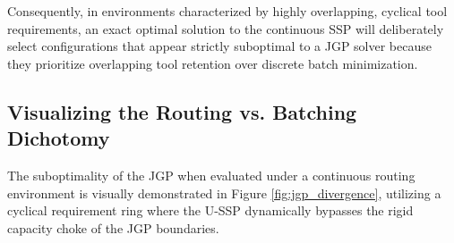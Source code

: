 \documentclass[11pt, a4paper]{book}
\begin{document}
	Consequently, in environments characterized by highly overlapping, cyclical tool requirements, an exact optimal solution to the continuous SSP will deliberately select configurations that appear strictly suboptimal to a JGP solver because they prioritize overlapping tool retention over discrete batch minimization.
	
	\subsection{Visualizing the Routing vs. Batching Dichotomy}
	
	The suboptimality of the JGP when evaluated under a continuous routing environment is visually demonstrated in Figure \ref{fig:jgp_divergence}, utilizing a cyclical requirement ring where the U-SSP dynamically bypasses the rigid capacity choke of the JGP boundaries.
	
\end{document}
